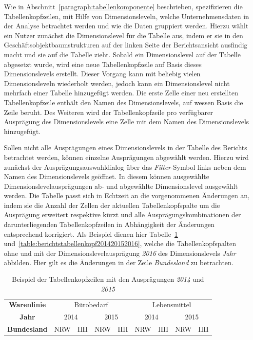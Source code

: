 \documentclass[
  language=german, %
  type=bachelor%
]{isthesis}
\begin{document}
\begin{content}
  Wie in Abschnitt~\ref{paragraph:tabellenkomponente} beschrieben,
  spezifizieren die Tabellenkopfzeilen, mit Hilfe von Dimensionsleveln, welche
  Unternehmensdaten in der Analyse betrachtet werden und wie die Daten
  gruppiert werden. Hierzu wählt ein Nutzer zunächst die Dimensionslevel für
  die Tabelle aus, indem er sie in den Geschäftsobjektbaumstrukturen auf der
  linken Seite der Berichtsansicht ausfindig macht und sie auf die Tabelle
  zieht. Sobald ein Dimensionslevel auf der Tabelle abgesetzt wurde, wird eine
  neue Tabellenkopfzeile auf Basis dieses Dimensionslevels erstellt. Dieser
  Vorgang kann mit beliebig vielen Dimensionsleveln wiederholt werden, jedoch
  kann ein Dimensionslevel nicht mehrfach einer Tabelle hinzugefügt werden. Die
  erste Zelle einer neu erstellten Tabellenkopfzeile enthält den Namen des
  Dimensionslevels, auf wessen Basis die Zeile beruht. Des Weiteren wird der
  Tabellenkopfzeile pro verfügbarer Ausprägung des Dimensionslevels eine Zelle
  mit dem Namen des Dimensionslevels hinzugefügt.

  Sollen nicht alle Ausprägungen eines Dimensionslevels in der Tabelle des
  Berichts betrachtet werden, können einzelne Ausprägungen abgewählt werden.
  Hierzu wird zunächst der Ausprägungsauswahldialog über das
  \textit{Filter}-Symbol links neben dem Namen des Dimensionslevels geöffnet.
  In diesem können ausgewählte Dimensionslevelausprägungen ab- und abgewählte
  Dimensionslevel ausgewählt werden. Die Tabelle passt sich in Echtzeit an die
  vorgenommenen Änderungen an, indem sie die Anzahl der Zellen der aktuellen
  Tabellenkopfspalte um die Ausprägung erweitert respektive kürzt und alle
  Ausprägungskombinationen der darunterliegenden Tabellenkopfzeilen in
  Abhängigkeit der Änderungen entsprechend korrigiert. Als Beispiel dienen hier
  Tabelle~\ref{table:berichtstabellenkopf20142015}
  und~\ref{table:berichtstabellenkopf201420152016}, welche die Tabellenkopfspalten
  ohne und mit der Dimensionslevelausprägung \textit{2016} des Dimensionslevels
  \textit{Jahr} abbilden. Hier gilt es die Änderungen in der Zeile
  \textit{Bundesland} zu betrachten.

    \begin{table}[]
      \footnotesize
      \begin{tabular}{c c c c c c c c c}
        \textbf{Warenlinie} & \multicolumn{4}{c}{Bürobedarf} & \multicolumn{4}{c}{Lebensmittel} \\
        \textbf{Jahr} & \multicolumn{2}{c}{2014} & \multicolumn{2}{c}{2015} & \multicolumn{2}{c}{2014} & \multicolumn{2}{c}{2015}\\
        \textbf{Bundesland} & NRW & HH & NRW & HH & NRW & HH & NRW & HH \\
      \end{tabular}
      \caption{Beispiel der Tabellenkopfzeilen mit den Ausprägungen \textit{2014} und \textit{2015}}\label{table:berichtstabellenkopf20142015}
    \end{table}


\end{content}
\end{document}

